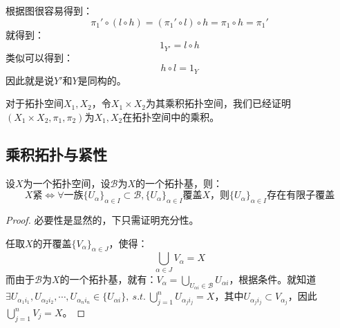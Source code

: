 \documentclass[lang=cn,10pt,device=pad]{elegantbook}
\newcommand{\tpj}{\mathcal{B}}
\newcommand{\st}{~s.t.~}
\newcommand{\dabing}{\displaystyle\bigcup}
\newcommand{\dkh}[1]{\{#1\}}
\begin{document}
\begin{note}
\begin{center}
	\end{center}
	
根据图很容易得到：
\begin{equation*}
	\pi_{1}'\circ (l\circ h) = (\pi_{1}'\circ l)\circ h = \pi_{1}\circ h = \pi_{1}'
\end{equation*}
就得到：
\begin{equation*}
	1_{Y'} = l\circ h
\end{equation*}
类似可以得到：
\begin{equation*}
	h\circ l = 1_{Y} 
\end{equation*}
因此就是说$Y'$和$Y$是同构的。
\end{note}
\begin{conclusion}
	对于拓扑空间$X_{1},X_{2}$，令$X_{1}\times X_{2}$为其乘积拓扑空间，我们已经证明$(X_{1}\times X_{2},\pi_{1},\pi_{2})$为$X_{1},X_{2}$在拓扑空间中的乘积。
\end{conclusion}
\subsection{乘积拓扑与紧性}
\begin{lemma}
	设$X$为一个拓扑空间，设$\tpj$为$X$的一个拓扑基，则：
	\begin{equation*}
		X\text{紧}\iff \forall\text{一族}\dkh{U_{\alpha}}_{\alpha \in I}\subset\tpj,\dkh{U_{\alpha}}_{\alpha \in I}\text{覆盖}X\text{，则}\dkh{U_{\alpha}}_{\alpha\in  I}\text{存在有限子覆盖}
	\end{equation*}
\end{lemma}
\begin{proof}
	必要性是显然的，下只需证明充分性。
	
	任取$X$的开覆盖$\dkh{V_{\alpha}}_{\alpha\in J}$，使得：
	\begin{equation*}
		\dabing_{\alpha\in J}V_{\alpha} = X
	\end{equation*}
而由于$\tpj$为$X$的一个拓扑基，就有：$V_{\alpha} = \dabing_{U_{\alpha i}\in \tpj}U_{\alpha i}$，根据条件。就知道$\exists U_{\alpha_{1}i_{1}},U_{\alpha_{2}i_{2}},\cdots,U_{\alpha_{n}i_{n}}\in \dkh{U_{\alpha i}},\st \dabing_{j=1}^{n}U_{\alpha_{j}i_{j}} = X$，其中$U_{\alpha_{j}i_{j}}\subset V_{\alpha_{j}}$，因此$\dabing_{j=1}^{n}V_{j} = X$。
\end{proof}
\end{document}
